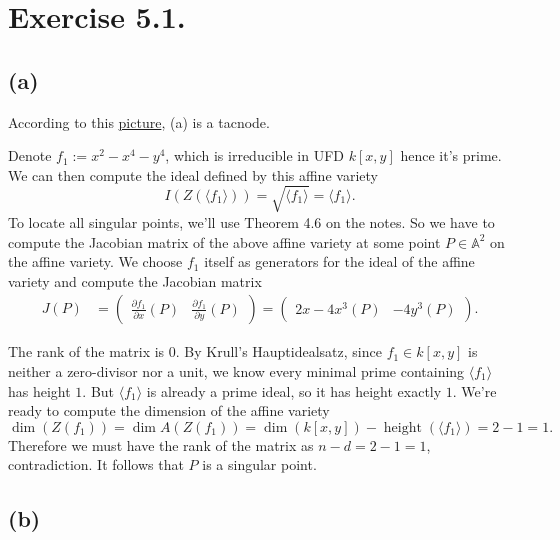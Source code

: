 \section{Exercise 5.1.}

\subsection{(a)}

According to this \href{https://www.desmos.com/calculator/08sanf19br}{picture}, (a) is a tacnode. 

Denote $f_1:=x^2-x^4-y^4$, which is irreducible in UFD $k[x,y]$ hence it's prime. We can then compute the ideal defined by this affine variety 
\[I(Z(\langle f_1\rangle))=\sqrt{\langle f_1\rangle}=\langle f_1\rangle.\]
To locate all singular points, we'll use Theorem 4.6 on the notes. So we have to compute the Jacobian matrix of the above affine variety at some point $P\in \mathbb A^2$ on the affine variety. We choose $f_1$ itself as generators for the ideal of the affine variety and compute the Jacobian matrix
\begin{align*}
    J(P) &= \begin{pmatrix}
        \frac{\partial f_1}{\partial x}(P) & \frac{\partial f_1}{\partial y}(P)
    \end{pmatrix}=
            \begin{pmatrix}
                2x-4x^3 (P) & -4y^3 (P)
            \end{pmatrix}.
\end{align*}

The rank of the matrix is $0$. By Krull's Hauptidealsatz, since $f_1\in k[x,y]$ is neither a zero-divisor nor a unit, we know every minimal prime containing $\langle f_1\rangle$ has height $1$. But $\langle f_1\rangle$ is already a prime ideal, so it has height exactly $1$. We're ready to compute the dimension of the affine variety 
\[\operatorname{dim}(Z(f_1))=\operatorname{dim}A(Z(f_1))=\operatorname{dim}(k[x,y])-\operatorname{height}(\langle f_1\rangle)=2-1=1.\]
Therefore we must have the rank of the matrix as $n-d=2-1=1$, contradiction. It follows that $P$ is a singular point.

\subsection{(b)}

